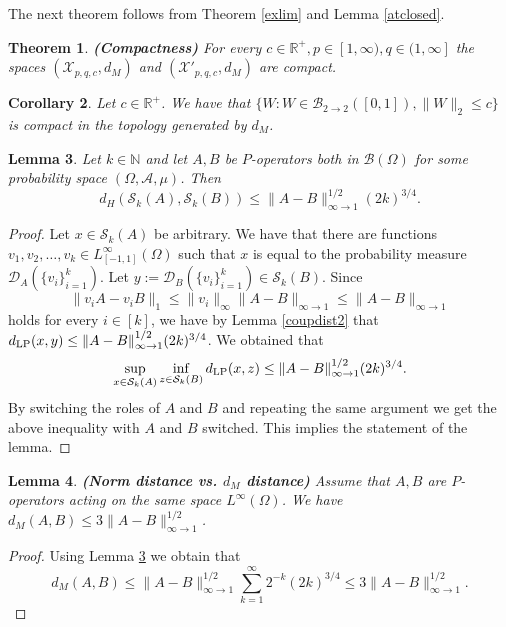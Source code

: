 \documentclass[a4wider]{amsart}
\newtheorem{theorem}{Theorem}[section]
\newtheorem{corollary}[theorem]{Corollary}
\newtheorem{lemma}[theorem]{Lemma}
\theoremstyle{definitionbreak}\newtheorem{D}[theorem]{Definition}
\theoremstyle{definitionbreak}\newtheorem*{D*}{Definition}
\begin{document}
The next theorem follows from Theorem \ref{exlim} and Lemma \ref{atclosed}. 

\begin{theorem}  \label{thm:compact} {\bf (Compactness)} For every $c\in\mathbb{R}^+,p\in [1,\infty),q\in (1,\infty]$ the spaces $(\mathcal{X}_{p,q,c},d_M)$ and $(\mathcal{X}'_{p,q,c},d_M)$ are compact. 
\end{theorem}

\begin{corollary} Let $c\in\mathbb{R}^+$. We have that $\{W:W\in \mathcal{B}_{2\to 2}([0,1]) , \|W\|_2\leq c\}$ is compact in the topology generated by $d_M$.
\end{corollary}

\begin{lemma}\label{limlem3} Let $k\in\mathbb{N}$ and let $A,B$ be $P$-operators both in $\mathcal{B}(\Omega)$ for some probability space $(\Omega,\mathcal{A},\mu)$. Then $$d_H(\mathcal{S}_k(A),\mathcal{S}_k(B))\leq \|A-B\|_{\infty\to 1}^{1/2}(2k)^{3/4}.$$
\end{lemma}

\begin{proof} Let $x\in \mathcal{S}_k(A)$ be arbitrary. We have that there are functions $v_1,v_2,\dots,v_k\in L^\infty_{[-1,1]}(\Omega)$  such that $x$ is equal to the probability measure $\mathcal{D}_A(\{v_i\}_{i=1}^k)$. Let $y:=\mathcal{D}_B(\{v_i\}_{i=1}^k)\in\mathcal{S}_k(B)$. Since  $$\|v_iA-v_iB\|_1\leq \|v_i\|_\infty\|A-B\|_{\infty\to 1}\leq\|A-B\|_{\infty\to 1}$$ holds for every $i\in [k]$, we have by Lemma \ref{coupdist2} that $d_{\rm LP}(x,y)\leq \|A-B\|_{\infty\to 1}^{1/2}(2k)^{3/4}$. We obtained that $$\sup_{x\in\mathcal{S}_k(A)}\inf_{z\in\mathcal{S}_k(B)}d_{\rm LP}(x,z)\leq \|A-B\|_{\infty\to 1}^{1/2}(2k)^{3/4}.$$ By switching the roles of $A$ and $B$ and repeating the same argument we get the above inequality with $A$ and $B$ switched. This implies the statement of the lemma.
\end{proof}


\begin{lemma}\label{limspdm} {\bf (Norm distance vs. $d_M$ distance)} Assume that $A,B$ are $P$-operators acting on the same space $L^\infty(\Omega)$. We have  $d_M(A,B)\leq 3\|A-B\|_{\infty\to 1}^{1/2}$.
\end{lemma}

\begin{proof} Using Lemma \ref{limlem3} we obtain that 
\begin{equation*}d_M(A,B)\leq \|A-B\|_{\infty\to 1}^{1/2}\sum_{k=1}^\infty 2^{-k}(2k)^{3/4}\leq 3\|A-B\|_{\infty\to 1}^{1/2}.\end{equation*}
\end{proof}
\end{document}
